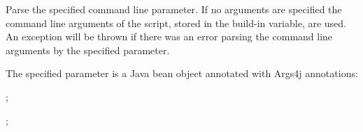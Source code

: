 %


Parse the specified command line parameter. If no 
arguments are specified the command line arguments of the script, stored in
the  build-in variable, are used.
An exception will be thrown if there was an error parsing the command line arguments
by the specified parameter.

The specified parameter is a Java bean object annotated with 
Args4j\cite{args4j13} annotations:
\begin{inparaitem}
\item {};
\item {};
\end{inparaitem}

